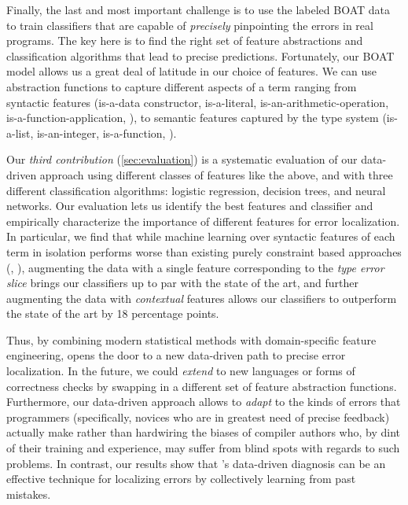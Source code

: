 %
Finally, the last and most important challenge is to
use the labeled BOAT data to train classifiers that
are capable of \emph{precisely} pinpointing the errors
in real programs.
%
The key here is to find the right set of feature
abstractions and classification algorithms that
lead to precise predictions.
%
Fortunately, our BOAT model allows us a great deal of
latitude in our choice of features.
%
We can use abstraction functions to capture different
aspects of a term ranging from
%
syntactic features (\eg is-a-data constructor, is-a-literal,
is-an-arithmetic-operation, is-a-function-application, \etc),
%
to semantic features captured by the type system (\eg is-a-list,
is-an-integer, is-a-function, \etc).

Our \emph{third contribution} (\autoref{sec:evaluation})
is a systematic evaluation of our data-driven approach
using different classes of features like the above, and
with three different classification algorithms: logistic
regression, decision trees, and neural networks.
%
Our evaluation lets us identify the best features and
classifier and empirically characterize the importance
of different features for error localization.
%
In particular, we find that while machine learning
over syntactic features of each term in isolation
performs worse than existing
purely constraint based approaches (\eg \ocaml, \sherrloc),
augmenting the data with a single feature corresponding to
the \emph{type error slice} \citep{Tip2001-qp} brings our
classifiers up to par with the state of the art,
and further augmenting the data with \emph{contextual}
features allows our classifiers to outperform
the state of the art by 18 percentage points.

Thus, by combining modern statistical methods
with domain-specific feature engineering, \toolname
opens the door to a new data-driven path to
precise error localization.
%
In the future, we could \emph{extend}
\toolname to new languages or forms
of correctness checks by swapping in
a different set of feature abstraction
functions.
%
Furthermore, our data-driven approach
allows \toolname to \emph{adapt} to
the kinds of errors that programmers
(specifically, novices who are in greatest
need of precise feedback) actually make
rather than hardwiring the biases of
compiler authors who, by dint of their
training and experience, may suffer from
blind spots with regards to such problems.
%
In contrast, our results show that \toolname's
data-driven diagnosis can be an effective
technique for localizing errors by collectively
learning from past mistakes.

